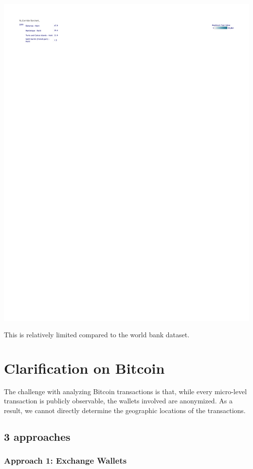 \documentclass[
  11pt,
]{article}
\begin{document}
\includegraphics{data/Remittance_3/remitscope_page_40.png}

This is relatively limited compared to the world bank dataset.

\section{Clarification on Bitcoin}\label{clarification-on-bitcoin}

The challenge with analyzing Bitcoin transactions is that, while every
micro-level transaction is publicly observable, the wallets involved are
anonymized. As a result, we cannot directly determine the geographic
locations of the transactions.

\subsection{3 approaches}\label{approaches}

\subsubsection{Approach 1: Exchange
Wallets}\label{approach-1-exchange-wallets}
\end{document}
